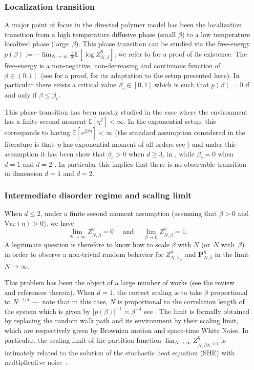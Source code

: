 \documentclass[JEP,XML,SOM,Unicode,published]{cedram}
\theoremstyle{definition}
\newcommand{\bP}{{\ensuremath{\mathbf P}} }
\newcommand{\Var}{\mathrm{Var}}
\newcommand{\bbE}{{\ensuremath{\mathbb E}} }
\let\gb\beta
\begin{document}
\subsubsection*{Localization transition}

A major point of focus in the directed polymer model has been the localization transition from a high temperature diffusive phase (small $\beta$) to a low temperature localized phase (large~$\beta$).
This phase transition can be studied via the free-energy $p(\beta):= -\lim_{N\to \infty}\frac{1}{N} \bbE [\log Z^{\eta}_{N,\beta}]$;
we refer to \cite[Prop.\,2.5]{CSY03} for a proof of its existence.
The free-energy is a non-negative, non-decreasing and continuous function of $\beta\in (0,1)$
(see \cite[Th.\,3.2]{CSY06} for a proof, \cite[Th.\,A.1]{Vi19} for its adaptation to the setup presented here). In particular there exists a critical value $\beta_c\in [0,1]$ which is such that $p(\gb)=0$ if and only if $\beta \leq \gb_c$.

This phase transition has been mostly studied in the case where the environment has a finite second moment
$\bbE[\eta^2]<\infty$. In the exponential setup, this corresponds to having $\bbE[e^{2\beta\tilde \eta}]<\infty$ (the standard assumption considered in the literature is that~$\eta$ has exponential moment of all orders see \eg \cite{AKQ10})
and under this assumption it has been show that $\beta_c>0$ when $d\ge 3$, in \cite{Bol89,IS88}, while $\beta_c=0$ when $d=1$ \cite{CV06} and $d=2$ \cite{Lac10pol}. In particular this implies that there is no observable transition in dimension $d=1$ and $d=2$.

\subsubsection*{Intermediate disorder regime and scaling limit}

When $d \le 2$, under a finite second moment assumption (assuming that $\beta>0$ and $\Var(\eta)>0$), we have
\begin{equation}%
\lim_{N \to \infty} Z^{\eta}_{N,\beta}= 0 \quad \text{ and } \quad
\lim_{\beta\to 0} Z^{\eta}_{N,\beta}=1.
\end{equation}
A legitimate question is therefore to know how
to scale $\beta$ with $N$ (or~$N$ with~$\beta$) in order to observe a non-trivial random behavior for $Z^{\eta}_{N,\beta_N}$ and $\bP^{\eta}_{N,\beta}$ in the limit $N\to\infty$.

This problem has been the object of a large number of works \cite{AKQ10, CSZ14, CSZ13} (see the review~\cite{CSZreview} and references therein). When $d=1$, the correct scaling is to take $\beta$ proportional to $N^{-1/4}$
---~note that in this case, $N$ is proportional to the correlation length of the system which is given by $|p(\beta)|^{-1}\asymp \beta^{-4}$ see \cite{AY15, Nak16}.
The limit is formally obtained by replacing the random walk path and its environment by their scaling limit, which are respectively given by Brownian motion and space-time White Noise.
In particular, the scaling limit of the partition function $\lim_{N\to \infty} Z^{\eta}_{N, \hat \beta N^{-1/4}}$ is intimately related to the solution of the stochastic heat equation (SHE) with multiplicative noise~\cite{CB95}.
\end{document}
